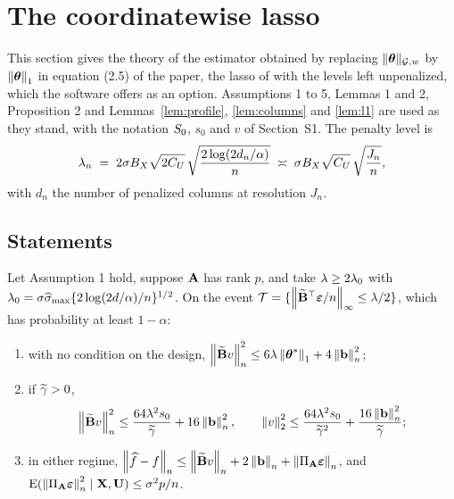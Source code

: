 \section{The coordinatewise lasso}
\setcounter{equation}{0}

\noindent[k = 4: the statements of this section stood in Sections 3.2 to 3.6 of
the paper, and their proofs in Sections S5 to S7 of this supplement.]

This section gives the theory of the estimator obtained by replacing
$\lVert \boldsymbol{\theta}\rVert_{\mathcal{G},w}$ by $\left\lVert \boldsymbol{\theta} \right\rVert_{1}$ in equation (2.5) of the paper, the
lasso of \citet{tibshirani1996regression} with the levels left unpenalized,
which the software offers as an option. Assumptions 1 to 5, Lemmas 1 and 2,
Proposition 2 and Lemmas~\ref{lem:profile}, \ref{lem:columns} and \ref{lem:l1}
are used as they stand, with the notation $S_{0}$, $s_0$ and $v$ of
Section~S1. The penalty level is
\begin{equation}
  \label{eq:lasso-lambda}
  \lambda_{n} \;=\; 2\sigma B_X\sqrt{2C_U}\,
  \sqrt{\frac{2\log(2d_n/\alpha)}{n}} \;\asymp\;
  \sigma B_X \sqrt{C_U}\,\sqrt{\frac{J_n}{n}} ,
\end{equation}
with $d_n$ the number of penalized columns at resolution $J_n$.

\subsection*{Statements}

\begin{theorem}
\label{thm:lasso-oracle}
Let Assumption 1 hold, suppose $\mathbf{A}$ has rank $p$, and take
$\lambda \ge 2\lambda_0$ with
$\lambda_0 = \sigma\widehat{\sigma}_{\max}\{2\log(2d/\alpha)/n\}^{1/2}$. On the event
$\mathcal{T} = \{\left\lVert \widetilde{\mathbf{B}}^{\top}\boldsymbol{\varepsilon}/n \right\rVert_{\infty} \le \lambda/2\}$, which has
probability at least $1 - \alpha$:
\begin{enumerate}
\item[(i)] with no condition on the design,
$\left\lVert \widetilde{\mathbf{B}} v \right\rVert_{n}^{2} \le 6\lambda\left\lVert \boldsymbol{\theta}^{*} \right\rVert_{1} + 4\left\lVert \mathbf{b} \right\rVert_{n}^{2}$;
\item[(ii)] if $\widetilde{\gamma} > 0$,
\[
  \left\lVert \widetilde{\mathbf{B}} v \right\rVert_{n}^{2} \le \frac{64\lambda^{2}s_0}{\widetilde{\gamma}} + 16\left\lVert \mathbf{b} \right\rVert_{n}^{2},
  \qquad
  \left\lVert v \right\rVert_{2}^{2} \le \frac{64\lambda^{2}s_0}{\widetilde{\gamma}^{2}}
  + \frac{16\left\lVert \mathbf{b} \right\rVert_{n}^{2}}{\widetilde{\gamma}} ;
\]
\item[(iii)] in either regime,
$\left\lVert \widehat{f}-f \right\rVert_{n} \le \left\lVert \widetilde{\mathbf{B}} v \right\rVert_{n} + 2\left\lVert \mathbf{b} \right\rVert_{n}
+ \left\lVert \Pi_{\mathbf{A}}\boldsymbol{\varepsilon} \right\rVert_{n}$, and
$\mathrm{E}(\left\lVert \Pi_{\mathbf{A}}\boldsymbol{\varepsilon} \right\rVert_{n}^{2}\mid\mathbf{X},\mathbf{U}) \le \sigma^{2}p/n$.
\end{enumerate}
\end{theorem}

